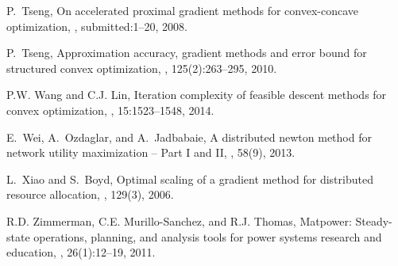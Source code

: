 \documentclass{gOMS2e}
\theoremstyle{plain}
\theoremstyle{definition}
\theoremstyle{remark}
\begin{document}
\begin{thebibliography}{99}
P.~Tseng,
\newblock On accelerated proximal gradient methods for convex-concave optimization,
, submitted:1--20, 2008.

P.~Tseng,
\newblock Approximation accuracy, gradient methods and error bound for structured convex optimization,
, 125(2):263--295, 2010.

P.W. Wang and C.J. Lin,
\newblock Iteration complexity of feasible descent methods for convex optimization,
, 15:1523--1548, 2014.

E.~Wei, A.~Ozdaglar, and A.~Jadbabaie,
\newblock A distributed newton method for network utility maximization --
{Part I and II},
, 58(9), 2013.

L.~Xiao and S.~Boyd,
\newblock Optimal scaling of a gradient method for distributed resource allocation,
, 129(3), 2006.

R.D. Zimmerman, C.E. Murillo-Sanchez, and R.J. Thomas,
\newblock Matpower: Steady-state operations, planning, and analysis tools for power systems research and education,
, 26(1):12--19, 2011.

\end{thebibliography}
\end{document}
